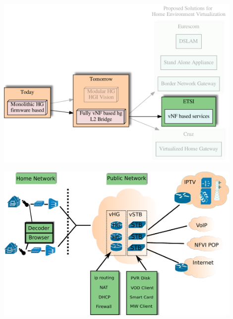 \documentclass[a4paper]{beamer}
\begin{document}
\begin{frame}[plain,T]{}
	\includegraphics[width=0.9\textwidth]{vhgtrends-etsi-emphasis.pdf}
\end{frame}

\begin{frame}[plain,T]{}
	\begin{centering}
		\includegraphics[width=0.9\textwidth]{etsi-virtualisation-home-env.pdf}
	\end{centering}
			
\end{frame}
\end{document}

